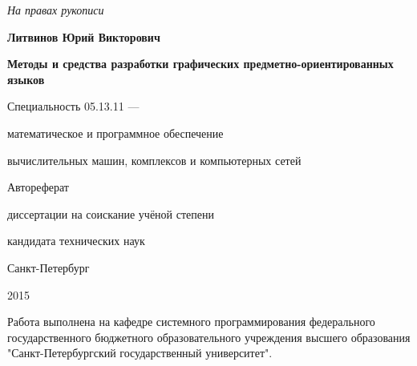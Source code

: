 \newcommand{\sfs}{\fontsize{10pt}{10pt}\selectfont}
\sfs %
\thispagestyle{empty}

\vspace{10mm}
\begin{flushright}
  \Large\textit{На правах рукописи}
\end{flushright}

\vspace{25mm}
\begin{center}
  \Large\bf{Литвинов Юрий Викторович}
\end{center}

\vspace{20mm}
\begin{center}
  {\bf \LARGE Методы и средства разработки графических предметно-ориентированных языков
\par}

\vspace{20mm}
{\Large
Специальность 05.13.11 ---\par
математическое и программное обеспечение\par
вычислительных машин, комплексов и компьютерных сетей
}

\vspace{15mm}
\LARGE Автореферат\par
\Large{диссертации на соискание учёной степени\par
кандидата технических наук}
\end{center}

\vspace{35mm}
\begin{center}
  \Large{Санкт-Петербург\par 2015}
\end{center}

\newpage
\thispagestyle{empty}

\small{
Работа выполнена на кафедре системного программирования федерального государственного
бюджетного образовательного учреждения высшего образования "Санкт-Петербургский
государственный университет".
}

